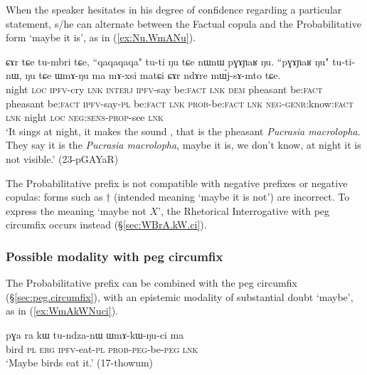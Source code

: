 When the speaker hesitates in his degree of confidence regarding a particular statement, s/he can alternate between the Factual copula  and the Probabilitative form  `maybe it is', as in (\ref{ex:Nu.WmANu}).

 
 \begin{exe}
 \ex \label{ex:Nu.WmANu}
\gll ɕɤr tɕe tu-mbri tɕe, ``qaqaqaqa" tu-ti ŋu tɕe nɯnɯ pɣɤɲaʁ ŋu. ``pɣɤɲaʁ ŋu" tu-ti-nɯ, ŋu tɕe ɯmɤ-ŋu ma mɤ-xsi matɕi ɕɤr ndɤre mɯ́j-sɤ-mto tɕe. \\
night \textsc{loc} \textsc{ipfv}-cry \textsc{lnk} \textsc{interj} \textsc{ipfv}-say be:\textsc{fact} \textsc{lnk} \textsc{dem} pheasant be:\textsc{fact} pheasant be:\textsc{fact} \textsc{ipfv}-say-\textsc{pl} be:\textsc{fact} \textsc{lnk} \textsc{prob}-be:\textsc{fact} \textsc{lnk} \textsc{neg}-\textsc{genr}:know:\textsc{fact} \textsc{lnk} night \textsc{loc} \textsc{neg}:\textsc{sens}-\textsc{prop}-see \textsc{lnk} \\
\glt `It sings at night, it makes the sound , that is the pheasant \textit{Pucrasia macrolopha}. They say it is the \textit{Pucrasia macrolopha}, maybe it is, we don't know, at night it is not visible.' (23-pGAYaR)
 \end{exe}
 
The Probabilitative prefix is not compatible with negative prefixes or negative copulas: forms such as $\dagger$ (intended meaning `maybe it is not') are incorrect. To express the meaning `maybe not $X$', the Rhetorical Interrogative  with peg circumfix occurs instead (§\ref{sec:WBrA.kW.ci}).
 
\subsubsection{Possible modality with peg circumfix} \label{sec:WmA.kW.ci}
The Probabilitative prefix can be combined with the peg circumfix (§\ref{sec:peg.circumfix}), with an epistemic modality of substantial doubt  `maybe', as in (\ref{ex:WmAkWNuci}).

\begin{exe}
\ex \label{ex:WmAkWNuci}
\gll pɣa ra kɯ tu-ndza-nɯ ɯmɤ-kɯ-ŋu-ci ma \\
bird \textsc{pl} \textsc{erg} \textsc{ipfv}-eat-\textsc{pl}  \textsc{prob}-\textsc{peg}-be-\textsc{peg} \textsc{lnk} \\
\glt `Maybe birds eat it.' (17-thowum) 
\end{exe}


